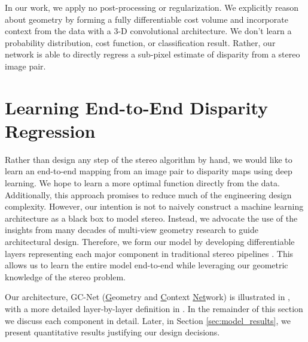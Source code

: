 In our work, we apply no post-processing or regularization. We explicitly reason about geometry by forming a fully differentiable cost volume and incorporate context from the data with a 3-D convolutional architecture.  We don't learn a probability distribution, cost function, or classification result.  Rather, our network is able to directly regress a sub-pixel estimate of disparity from a stereo image pair.

\section{Learning End-to-End Disparity Regression}
\label{section:model}

Rather than design any step of the stereo algorithm by hand, we would like to learn an end-to-end mapping from an image pair to disparity maps using deep learning. We hope to learn a more optimal function directly from the data. Additionally, this approach promises to reduce much of the engineering design complexity. However, our intention is not to naively construct a machine learning architecture as a black box to model stereo. Instead, we advocate the use of the insights from many decades of multi-view geometry research \citep{hartley2000} to guide architectural design. Therefore, we form our model by developing differentiable layers representing each major component in traditional stereo pipelines \citep{scharstein2002taxonomy}. This allows us to learn the entire model end-to-end while leveraging our geometric knowledge of the stereo problem. 

Our architecture, GC-Net (\underline{G}eometry and \underline{C}ontext \underline{Net}work) is illustrated in , with a more detailed layer-by-layer definition in . In the remainder of this section we discuss each component in detail. Later, in Section \ref{sec:model_results}, we present quantitative results justifying our design decisions.

